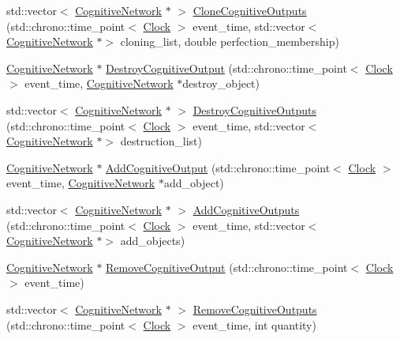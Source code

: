 \begin{DoxyCompactItemize}
\item 
std\+::vector$<$ \hyperlink{class_cognitive_network}{Cognitive\+Network} $\ast$ $>$ \hyperlink{class_cognitive_network_a5734aa5378e9b701dca5e98017c1ea35}{Clone\+Cognitive\+Outputs} (std\+::chrono\+::time\+\_\+point$<$ \hyperlink{universe_8h_a0ef8d951d1ca5ab3cfaf7ab4c7a6fd80}{Clock} $>$ event\+\_\+time, std\+::vector$<$ \hyperlink{class_cognitive_network}{Cognitive\+Network} $\ast$$>$ cloning\+\_\+list, double perfection\+\_\+membership)
\item 
\hyperlink{class_cognitive_network}{Cognitive\+Network} $\ast$ \hyperlink{class_cognitive_network_a8475cf7277d25532bb31926e768600e8}{Destroy\+Cognitive\+Output} (std\+::chrono\+::time\+\_\+point$<$ \hyperlink{universe_8h_a0ef8d951d1ca5ab3cfaf7ab4c7a6fd80}{Clock} $>$ event\+\_\+time, \hyperlink{class_cognitive_network}{Cognitive\+Network} $\ast$destroy\+\_\+object)
\item 
std\+::vector$<$ \hyperlink{class_cognitive_network}{Cognitive\+Network} $\ast$ $>$ \hyperlink{class_cognitive_network_ad08191cbab02f26f69d25bc7e6b5c1ee}{Destroy\+Cognitive\+Outputs} (std\+::chrono\+::time\+\_\+point$<$ \hyperlink{universe_8h_a0ef8d951d1ca5ab3cfaf7ab4c7a6fd80}{Clock} $>$ event\+\_\+time, std\+::vector$<$ \hyperlink{class_cognitive_network}{Cognitive\+Network} $\ast$$>$ destruction\+\_\+list)
\item 
\hyperlink{class_cognitive_network}{Cognitive\+Network} $\ast$ \hyperlink{class_cognitive_network_a8a9b533b89b7d62b21cf41bdf957ef14}{Add\+Cognitive\+Output} (std\+::chrono\+::time\+\_\+point$<$ \hyperlink{universe_8h_a0ef8d951d1ca5ab3cfaf7ab4c7a6fd80}{Clock} $>$ event\+\_\+time, \hyperlink{class_cognitive_network}{Cognitive\+Network} $\ast$add\+\_\+object)
\item 
std\+::vector$<$ \hyperlink{class_cognitive_network}{Cognitive\+Network} $\ast$ $>$ \hyperlink{class_cognitive_network_a6299433811b76f0ccb97cf69fe9bfb66}{Add\+Cognitive\+Outputs} (std\+::chrono\+::time\+\_\+point$<$ \hyperlink{universe_8h_a0ef8d951d1ca5ab3cfaf7ab4c7a6fd80}{Clock} $>$ event\+\_\+time, std\+::vector$<$ \hyperlink{class_cognitive_network}{Cognitive\+Network} $\ast$$>$ add\+\_\+objects)
\item 
\hyperlink{class_cognitive_network}{Cognitive\+Network} $\ast$ \hyperlink{class_cognitive_network_a9874b11ac465c84ccf7baab0a40fb84e}{Remove\+Cognitive\+Output} (std\+::chrono\+::time\+\_\+point$<$ \hyperlink{universe_8h_a0ef8d951d1ca5ab3cfaf7ab4c7a6fd80}{Clock} $>$ event\+\_\+time)
\item 
std\+::vector$<$ \hyperlink{class_cognitive_network}{Cognitive\+Network} $\ast$ $>$ \hyperlink{class_cognitive_network_a2f4956b004c828f0165f28c03e089144}{Remove\+Cognitive\+Outputs} (std\+::chrono\+::time\+\_\+point$<$ \hyperlink{universe_8h_a0ef8d951d1ca5ab3cfaf7ab4c7a6fd80}{Clock} $>$ event\+\_\+time, int quantity)
$$
\end{DoxyCompactItemize}
